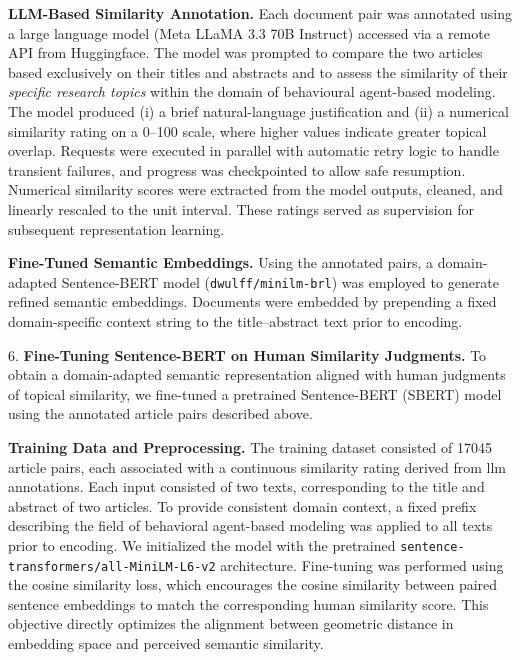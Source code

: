 \documentclass[pdflatex,sn-mathphys-num]{sn-jnl}%
\theoremstyle{thmstyleone}%
\theoremstyle{thmstyletwo}%
\theoremstyle{thmstylethree}%
\begin{document}
\vspace{0.75em}

\textbf{LLM-Based Similarity Annotation.}
Each document pair was annotated using a large language model (Meta LLaMA 3.3 70B Instruct) accessed via a remote API from Huggingface. The model was prompted to compare the two articles based exclusively on their titles and abstracts and to assess the similarity of their \emph{specific research topics} within the domain of behavioural agent-based modeling. The model produced (i) a brief natural-language justification and (ii) a numerical similarity rating on a 0--100 scale, where higher values indicate greater topical overlap. Requests were executed in parallel with automatic retry logic to handle transient failures, and progress was checkpointed to allow safe resumption. Numerical similarity scores were extracted from the model outputs, cleaned, and linearly rescaled to the unit interval. These ratings served as supervision for subsequent representation learning.

\vspace{0.75em}

\textbf{Fine-Tuned Semantic Embeddings.}
Using the annotated pairs, a domain-adapted Sentence-BERT model (\texttt{dwulff/minilm-brl}) was employed to generate refined semantic embeddings. Documents were embedded by prepending a fixed domain-specific context string to the title--abstract text prior to encoding.

\vspace{1em}

 {\Large 6.} \textbf{Fine-Tuning Sentence-BERT on Human Similarity Judgments.}
To obtain a domain-adapted semantic representation aligned with human judgments of topical similarity, we fine-tuned a pretrained Sentence-BERT (SBERT) model using the annotated article pairs described above.

\vspace{0.75em}

\textbf{Training Data and Preprocessing.}
The training dataset consisted of 17045 article pairs, each associated with a continuous similarity rating derived from llm annotations. Each input consisted of two texts, corresponding to the title and abstract of two articles. To provide consistent domain context, a fixed prefix describing the field of behavioral agent-based modeling was applied to all texts prior to encoding. We initialized the model with the pretrained \texttt{sentence-transformers/all-MiniLM-L6-v2} architecture. Fine-tuning was performed using the cosine similarity loss, which encourages the cosine similarity between paired sentence embeddings to match the corresponding human similarity score. This objective directly optimizes the alignment between geometric distance in embedding space and perceived semantic similarity.
\end{document}
